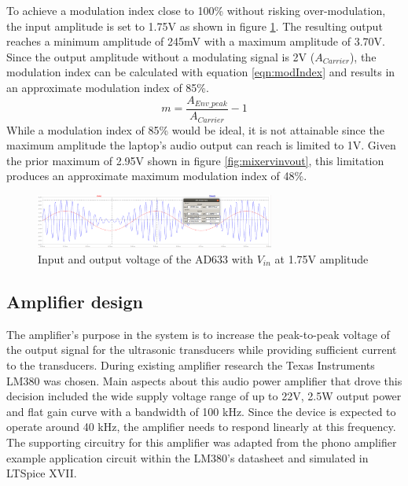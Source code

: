 To achieve a modulation index close to 100\% without risking over-modulation, the input amplitude is set to 1.75V as shown in figure \ref{fig:mixervin175}. The resulting output reaches a minimum amplitude of 245mV with a maximum amplitude of 3.70V. Since the output amplitude without a modulating signal is 2V ($A_{Carrier}$), the modulation index can be calculated with equation \ref{eqn:modIndex} and results in an approximate modulation index of 85\%.
\begin{equation}\label{eqn:modIndex}
    m = \frac{A_{Env\_peak}}{A_{Carrier}} - 1
\end{equation}
While a modulation index of 85\% would be ideal, it is not attainable since the maximum amplitude the laptop's audio output can reach is limited to 1V. Given the prior maximum of 2.95V shown in figure \ref{fig:mixervinvout}, this limitation produces an approximate maximum modulation index of 48\%.
\begin{figure}[ht!]
    \centering
    \includegraphics[width=0.7\textwidth]{Figures/Design/Mixer/175Vm10Vc.png}
    \caption{Input and output voltage of the AD633 with $V_{in}$ at 1.75V amplitude}
    \label{fig:mixervin175}
\end{figure}


\newpage
\subsection{Amplifier design}
The amplifier's purpose in the system is to increase the peak-to-peak voltage of the output signal for the ultrasonic transducers while providing sufficient current to the transducers. During existing amplifier research the Texas Instruments LM380 was chosen. Main aspects about this audio power amplifier that drove this decision included the wide supply voltage range of up to 22V, 2.5W output power and flat gain curve with a bandwidth of 100 kHz. Since the device is expected to operate around 40 kHz, the amplifier needs to respond linearly at this frequency.\\
The supporting circuitry for this amplifier was adapted from the phono amplifier example application circuit within the LM380's datasheet and simulated in LTSpice XVII.

